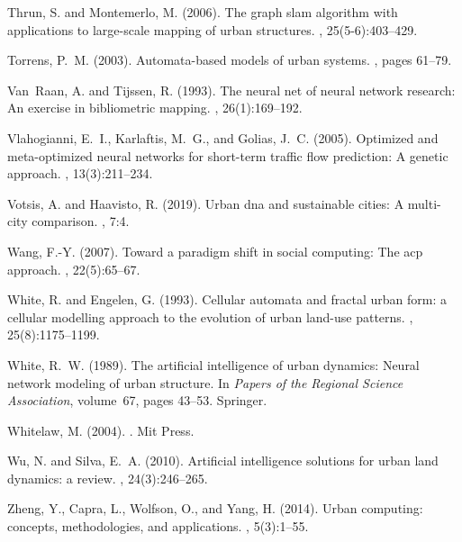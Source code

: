 \documentclass[letterpaper]{article}
\begin{document}
\begin{thebibliography}{}
Thrun, S. and Montemerlo, M. (2006).
\newblock The graph slam algorithm with applications to large-scale mapping of
  urban structures.
,
  25(5-6):403--429.

Torrens, P.~M. (2003).
\newblock Automata-based models of urban systems.
, pages 61--79.

Van~Raan, A. and Tijssen, R. (1993).
\newblock The neural net of neural network research: An exercise in
  bibliometric mapping.
, 26(1):169--192.

Vlahogianni, E.~I., Karlaftis, M.~G., and Golias, J.~C. (2005).
\newblock Optimized and meta-optimized neural networks for short-term traffic
  flow prediction: A genetic approach.
,
  13(3):211--234.

Votsis, A. and Haavisto, R. (2019).
\newblock Urban dna and sustainable cities: A multi-city comparison.
, 7:4.

Wang, F.-Y. (2007).
\newblock Toward a paradigm shift in social computing: The acp approach.
, 22(5):65--67.

White, R. and Engelen, G. (1993).
\newblock Cellular automata and fractal urban form: a cellular modelling
  approach to the evolution of urban land-use patterns.
, 25(8):1175--1199.

White, R.~W. (1989).
\newblock The artificial intelligence of urban dynamics: Neural network
  modeling of urban structure.
\newblock In {\em Papers of the Regional Science Association}, volume~67, pages
  43--53. Springer.

Whitelaw, M. (2004).
.
\newblock Mit Press.

Wu, N. and Silva, E.~A. (2010).
\newblock Artificial intelligence solutions for urban land dynamics: a review.
, 24(3):246--265.

Zheng, Y., Capra, L., Wolfson, O., and Yang, H. (2014).
\newblock Urban computing: concepts, methodologies, and applications.
,
  5(3):1--55.

\end{thebibliography}
\end{document}
